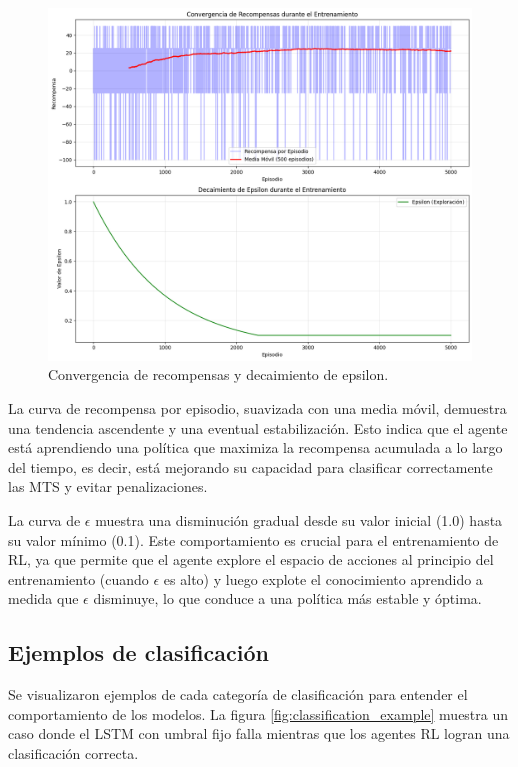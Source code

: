 \documentclass[12pt]{article}
\begin{document}
\begin{figure}[H]
\centering
\includegraphics[width=1\textwidth]{media/rl_training.png}
\caption{Convergencia de recompensas y decaimiento de epsilon.}
\label{fig:rl_convergence}
\end{figure}

La curva de recompensa por episodio, suavizada con una media móvil, demuestra una tendencia ascendente y una eventual estabilización.
Esto indica que el agente está aprendiendo una política que maximiza la recompensa acumulada a lo largo del tiempo, es decir, está mejorando su capacidad para clasificar correctamente las MTS y evitar penalizaciones.

La curva de $\epsilon$ muestra una disminución gradual desde su valor inicial (1.0) hasta su valor mínimo (0.1).
Este comportamiento es crucial para el entrenamiento de RL, ya que permite que el agente explore el espacio de acciones al principio del entrenamiento (cuando $\epsilon$ es alto) y luego explote el conocimiento aprendido a medida que $\epsilon$ disminuye, lo que conduce a una política más estable y óptima.

\subsection{Ejemplos de clasificación}
Se visualizaron ejemplos de cada categoría de clasificación para entender el comportamiento de los modelos.
La figura \ref{fig:classification_example} muestra un caso donde el LSTM con umbral fijo falla mientras que los agentes RL logran una clasificación correcta.
\end{document}
